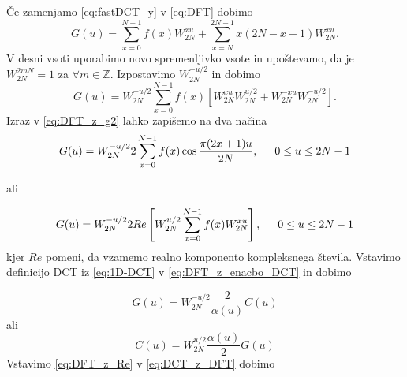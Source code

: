 \documentclass[a4paper,12pt,openright]{book}
\begin{document}
Če zamenjamo \ref{eq:fastDCT_y} v \ref{eq:DFT} dobimo
\begin{equation}
  G(u) = \sum_{x=0}^{N-1} f(x) W_{2N}^{xu} + \sum_{x=N}^{2N-1} x(2N-x-1) W_{2N}^{xu}.
\label{eq:DFT_z_g1}
\end{equation}
V desni vsoti uporabimo novo spremenljivko vsote in upoštevamo, da je $W_{2N}^{2mN} = 1$ za $\forall m \in \mathbb{Z}$. Izpostavimo $W_{2N}^{-u/2}$ in dobimo
\begin{equation}
  G(u) = W_{2N}^{-u/2}\sum_{x=0}^{N-1} f(x) \left[ W_{2N}^{xu}W_{2N}^{u/2} + W_{2N}^{-xu}W_{2N}^{-u/2} \right].
\label{eq:DFT_z_g2}
\end{equation}
Izraz v \ref{eq:DFT_z_g2} lahko zapišemo na dva načina
\begin{equation}
  G(u) = W_{2N}^{-u/2} 2 \sum_{x=0}^{N-1} f(x) \cos\frac{\pi(2x+1)u}{2N}, \indent 0 \leq u \leq 2N-1
\label{eq:DFT_z_enacbo_DCT}
\end{equation}

ali

\begin{equation}
  G(u) = W_{2N}^{-u/2} 2 Re \left[ W_{2N}^{u/2} \sum_{x=0}^{N-1} f(x) W_{2N}^{xu} \right], \indent 0 \leq u \leq 2N-1
\label{eq:DFT_z_Re}
\end{equation}
kjer $Re$ pomeni, da vzamemo realno komponento kompleksnega števila.
Vstavimo definicijo DCT iz \ref{eq:1D-DCT} v \ref{eq:DFT_z_enacbo_DCT} in dobimo

\begin{equation}
  G(u) = W_{2N}^{-u/2} \frac{2}{\alpha(u)} C(u)
\label{eq:DFT_z_DCT}
\end{equation}
ali
\begin{equation}
  C(u) = W_{2N}^{u/2} \frac{\alpha(u)}{2} G(u)
\label{eq:DCT_z_DFT}
\end{equation}
Vstavimo \ref{eq:DFT_z_Re} v \ref{eq:DCT_z_DFT} dobimo
\end{document}
